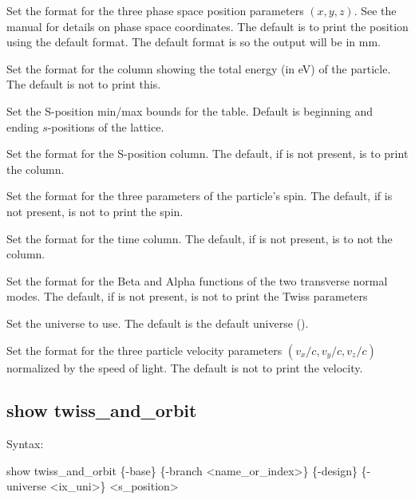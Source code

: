 {{{{{{{{{{{\begin{description}
Set the format for the three phase space position parameters $(x, y, z)$. See the \bmad manual for 
details on phase space coordinates. The default is to print the position using the default format.
The default format is  so the output will be in mm.
%
\item[\vn{\{-energy \{<fmt>\}\}}] \Newline
Set the format for the column showing the total energy (in eV) of the particle. The default is not
to print this.
%
\item[\vn{\{-range <s1> <s2>\}}] \Newline
Set the S-position min/max bounds for the table. Default is beginning and ending $s$-positions of the
lattice.
%
\item[\vn{\{-s \{<fmt>\}\}}] \Newline
Set the format for the S-position column. The default, if  is not present, is to print the
column.
%
\item[\vn{\{-spin \{<fmt>\}\}}] \Newline
Set the format for the three parameters of the particle's spin. The default, if
 is not present, is not to print the spin.
%
\item[\vn{\{-time \{<fmt>\}\}}] \Newline
Set the format for the time column. The default, if  is not present, is to not the column.
%
\item[\vn{\{-twiss \{<fmt>\}\}}] \Newline
Set the format for the Beta and Alpha functions of the two transverse normal modes. The default, if
 is not present, is not to print the Twiss parameters
%
\item[\vn{\{-universe <ix_uni>\}}] \Newline
Set the universe to use. The default is the default universe ().
%
\item[\vn{\{-velocity \{<fmt>\}\}}] \Newline
Set the format for the three particle velocity parameters $(v_x/c, v_y/c, v_z/c)$ normalized by the
speed of light. The default is not to print the velocity.
%
\end{description}


\subsection{show twiss_and_orbit}
\label{s:show.twiss}

Syntax:
\begin{example}
    show twiss_and_orbit \{-base\} \{-branch <name_or_index>\} \{-design\}
    \{-universe <ix_uni>\} <s_position>
\end{example}

}}}}}}}}}}}
